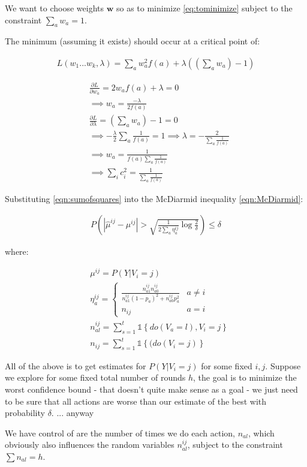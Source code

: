 \documentclass{article}
\newcommand{\set}[1]{\left\{#1\right\}}
\newcommand{\ind}[1]{\mathds{1}\!\!\set{#1}}
\newcommand{\eqn}[1]{\begin{align}#1\end{align}}
\theoremstyle{plain}
\theoremstyle{definition}
\begin{document}
We want to choose weights $\boldsymbol{w}$ so as to minimize \ref{eq:tominimize} subject to the constraint $\sum_a w_a = 1$.


The minimum (assuming it exists) should occur at a critical point of:

\eqn {
L(w_1...w_k,\lambda) = \sum_a w_a^2 f(a) + \lambda((\sum_a w_a)-1)
}

\eqn{
& \frac{\partial L}{\partial w_a}  = 2 w_a f(a) + \lambda = 0 \\
& \implies w_a =  \frac{-\lambda}{2 f(a)}\\
& \frac{\partial L}{\partial \lambda}  = (\sum_a w_a)-1= 0 \\
& \implies -\frac{\lambda}{2}\sum_a \frac{1}{f(a)} = 1
 \implies \lambda = -\frac{2}{\sum_a \frac{1}{f(a)}}\\
& \implies w_a = \frac{1}{f(a)\sum_a \frac{1}{f(a)}} \\
\label{eqn:sumofsquares}
& \implies \sum_i c_i^2 = \frac{1}{\sum_a \frac{1}{f(a)}} 
}

Substituting \ref{eqn:sumofsquares} into the McDiarmid inequality \ref{eqn:McDiarmid}:

\eqn{
P\left(|\hat{\mu}^{ij} - \mu^{ij}| > \sqrt{\frac{1}{2\sum_a \eta_a^{ij}} \log{\frac{2}{\delta}}}\right) \leq \delta
}

where:

\eqn {
& \mu^{ij} = P(Y | V_i = j) \\
& \eta_a^{ij} = \begin{cases}
\frac{n_{a1}^{ij} n_{a0}^{ij}}{n_{a1}^{ij}(1-p_a)^2+n_{a0}^{ij}p_a^2} & a \neq i\\
n_{ij} & a = i
\end{cases} \\
&n_{al}^{ij} = \sum_{s=1}^t \ind{do(V_a = l), V_i = j} \\
& n_{ij} = \sum_{s=1}^t \ind{(do(V_i = j)}
}






All of the above is to get estimates for $P(Y|V_i = j)$ for some fixed $i,j$. Suppose we explore for some fixed total number of rounds $h$, the goal is to minimize the worst confidence bound - that doesn't quite make sense as a goal - we just need to be sure that all actions are worse than our estimate of the best with probability $\delta$. ... anyway

We have control of are the number of times we do each action, $n_{al}$, which obviously also influences the random variables $n_{al}^{ij}$, subject to the constraint $\sum n_{al} = h$.
\end{document}
